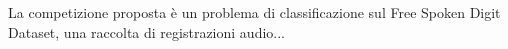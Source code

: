La competizione proposta è un problema di classificazione sul Free Spoken Digit Dataset, una raccolta di registrazioni audio...